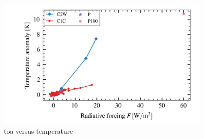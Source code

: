 \documentclass{ametsocV5}
\begin{document}
\begin{figure}
  \begin{center}
    \includegraphics[width=0.95\textwidth]{figures/toa_vs_temperature.png}
  \end{center}
  \caption{\acrshort{toa} versus temperature}
  \label{fig:toa_vs_temp}
\end{figure}

\clearpage




\end{document}
